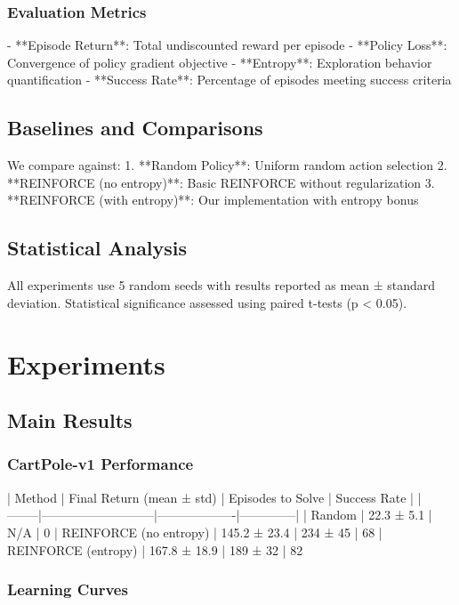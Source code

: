 \documentclass{article}
\begin{document}
\subsubsection{Evaluation Metrics}
- **Episode Return**: Total undiscounted reward per episode
- **Policy Loss**: Convergence of policy gradient objective
- **Entropy**: Exploration behavior quantification
- **Success Rate**: Percentage of episodes meeting success criteria

\subsection{Baselines and Comparisons}

We compare against:
1. **Random Policy**: Uniform random action selection
2. **REINFORCE (no entropy)**: Basic REINFORCE without regularization
3. **REINFORCE (with entropy)**: Our implementation with entropy bonus

\subsection{Statistical Analysis}

All experiments use 5 random seeds with results reported as mean ± standard deviation. Statistical significance assessed using paired t-tests (p < 0.05).

\section{Experiments}

\subsection{Main Results}

\subsubsection{CartPole-v1 Performance}

| Method | Final Return (mean ± std) | Episodes to Solve | Success Rate |
|--------|---------------------------|-------------------|--------------|
| Random | 22.3 ± 5.1 | N/A | 0%
| REINFORCE (no entropy) | 145.2 ± 23.4 | 234 ± 45 | 68%
| REINFORCE (entropy) | 167.8 ± 18.9 | 189 ± 32 | 82%

\subsubsection{Learning Curves}
\end{document}
